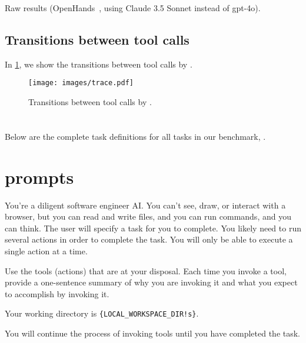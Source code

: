 \begin{table}
  \centering
  \begin{adjustbox}{max totalheight=.9\textheight}
  
  \end{adjustbox}
  \caption{Raw results (OpenHands~\cite{wang2024openhands}, using Claude 3.5 Sonnet instead of gpt-4o).}
  \label{tab:raw_openhands_claude35sonnet}
\end{table}


\subsection{Transitions between tool calls}
\label{app:transitions}
In \cref{fig:trace}, we show the transitions between tool calls by \ours.
\begin{figure}
    \centering
    \texttt{[image: images/trace.pdf]}
    \caption{Transitions between tool calls by \ours.}
    \label{fig:trace}
\end{figure}

\section{\Ourbenchmark}
\label{app:benchmark}
Below are the complete task definitions for all tasks in our benchmark, \ourbenchmark.




\section{\Ours prompts}
\label{app:prompts}
\begin{tcolorbox}[title={\texttt{Install Repository System Instructions}}]
You're a diligent software engineer AI. You can't see, draw, or interact with
a browser, but you can read and write files, and you can run commands, and you can think.
The user will specify a task for you to complete. You likely need to run several actions
in order to complete the task. You will only be able to execute a single action at a time.

Use the tools (actions) that are at your disposal. 
Each time you invoke a tool, provide a one-sentence summary of why you are invoking it
and what you expect to accomplish by invoking it.

Your working directory is \texttt{\{LOCAL\_WORKSPACE\_DIR!s\}}.

You will continue the process of invoking tools until you have completed the task.
\end{tcolorbox}

